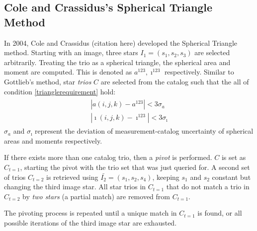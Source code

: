 \subsection{Cole and Crassidus's Spherical Triangle Method}
In 2004, Cole and Crassidus (citation here) developed the Spherical Triangle method. Starting with an image, three stars $I_1 = (s_1, s_2, s_3)$ are selected arbitrarily. Treating the trio as a spherical triangle, the spherical area and moment are computed. This is denoted as $a^{123}, \imath^{123}$ respectively. Similar to Gottlieb's method, star \textit{trios} $C$ are selected from the catalog such that the all of condition \eqref{trianglerequirement} hold:
\begin{align}
\begin{split}
\label{trianglerequirement}
| a(i, j, k) - a^{123} | < 3 \sigma_a
\\
| \imath(i, j, k) - \imath^{123} | < 3\sigma_{\imath}
\end{split}
\end{align}
$\sigma_a$ and $\sigma_{\imath}$ represent the deviation of measurement-catalog uncertainty of spherical areas and moments respectively. 

If there exists more than one catalog trio, then a \textit{pivot} is performed. $C$ is set as $C_{t=1}$, starting the pivot with the trio set that was just queried for. A second set of trios $C_{t=2}$ is retrieved using $\bar{I_2} = (s_1, s_2, s_4)$, keeping $s_1$ and $s_2$ constant but changing the third image star. All star trios in $C_{t=1}$ that do not match a trio in $C_{t=2}$ by \textit{two stars} (a partial match) are removed from $C_{t=1}$. 

The pivoting process is repeated until a unique match in $C_{t=1}$ is found, or all possible iterations of the third image star are exhausted. 

